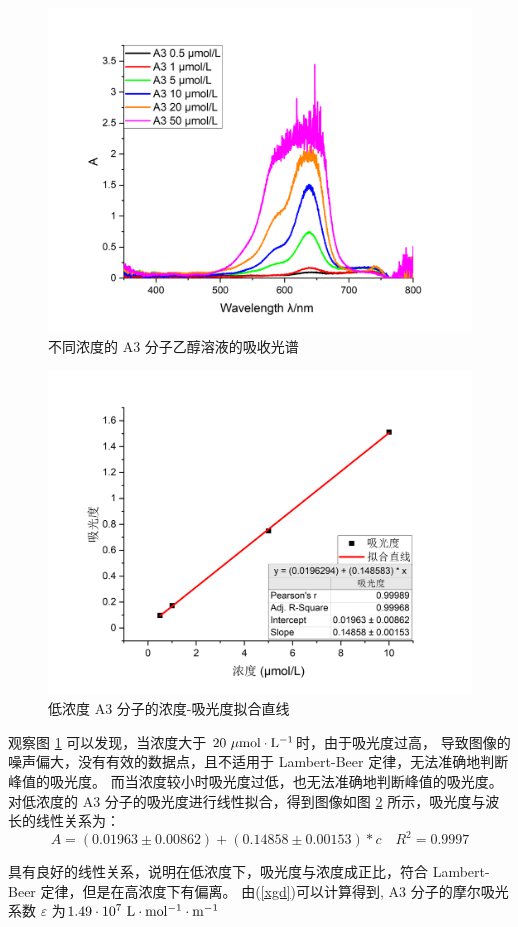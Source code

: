 \documentclass[cn,hazy,pku,12pt,normal,math=newtx,cite=super]{elegantnote}
\begin{document}
\begin{figure}[htbp]
    \centering
    \includegraphics[width = .60\textwidth]{image/nongdu.png}
    \caption{不同浓度的 A3 分子乙醇溶液的吸收光谱}\label{8}
\end{figure}


\begin{figure}[h]
    \centering
    \includegraphics[width = .60\textwidth]{image/xgdzhixian.png}
    \caption{低浓度 A3 分子的浓度-吸光度拟合直线}\label{10}
\end{figure}

观察图 \ref{8} 可以发现，当浓度大于$\ 20\ \mu {\rm mol \cdot  L^{-1}}$时，由于吸光度过高，
导致图像的噪声偏大，没有有效的数据点，且不适用于 Lambert-Beer 定律，无法准确地判断峰值的吸光度。
而当浓度较小时吸光度过低，也无法准确地判断峰值的吸光度。
对低浓度的 A3 分子的吸光度进行线性拟合，得到图像如图 \ref{10} 所示，吸光度与波长的线性关系为：
\begin{equation}\label{nihe2}
    A = (0.01963 \pm 0.00862) + (0.14858 \pm 0.00153) * c \quad R^2=0.9997
\end{equation}
    
具有良好的线性关系，说明在低浓度下，吸光度与浓度成正比，符合 Lambert-Beer 定律，但是在高浓度下有偏离。
由(\ref{xgd})可以计算得到, A3 分子的摩尔吸光系数 $\varepsilon$ 为$\rm 1.49 \cdot 10^7\ L \cdot mol^{-1} \cdot m^{-1}$
\end{document}
